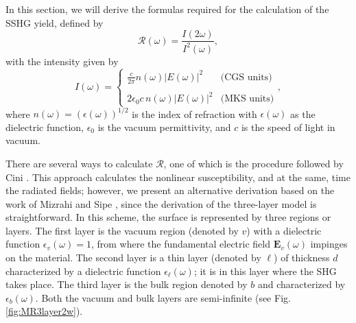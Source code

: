 \documentclass[aps,prb,10pt,showpacs,letterpaper,twocolumn]{revtex4-1}
\begin{document}
In this section, we will derive the formulas required for the calculation of the
SSHG yield, defined by
\begin{equation}\label{eq:rintensities}
\mathcal{R}(\omega)=\frac{I(2\omega)}{I^2(\omega)},
\end{equation}
with the intensity given by \cite{boyd, sutherland}
\begin{equation}\label{eq:intensity}
I(\omega)=
\left\{
\begin{array}{cc}
\frac{c}{2\pi}n(\omega)|E(\omega)|^{2} & \text{(CGS units)} \\\\
2\epsilon_{0}c\, n(\omega)|E(\omega)|^{2} & \text{(MKS units)}
\end{array}
\right.,
\end{equation}
where $n(\omega)=(\epsilon(\omega))^{1/2}$ is the index of refraction with
$\epsilon(\omega)$ as the dielectric function, $\epsilon_{0}$ is the vacuum
permittivity, and $c$ is the speed of light in vacuum.

There are several ways to calculate $\mathcal{R}$, one of which is the procedure
followed by Cini \cite{ciniPRB91}. This approach calculates the nonlinear
susceptibility, and at the same, time the radiated fields; however, we present
an alternative derivation based on the work of Mizrahi and Sipe
\cite{mizrahiJOSA88}, since the derivation of the three-layer model is
straightforward. In this scheme, the surface is represented by three regions or
layers. The first layer is the vacuum region (denoted by $v$) with a dielectric
function $\epsilon_{v}(\omega) = 1$, from where the fundamental electric field
$\mathbf{E}_{v}(\omega)$ impinges on the material. The second layer is a thin
layer (denoted by $\ell$) of thickness $d$ characterized by a dielectric
function $\epsilon_{\ell}(\omega)$; it is in this layer where the SHG takes
place. The third layer is the bulk region denoted by $b$ and characterized by
$\epsilon_{b}(\omega)$. Both the vacuum and bulk layers are semi-infinite (see
Fig. \ref{fig:MR3layer2w}).
 
\end{document}
